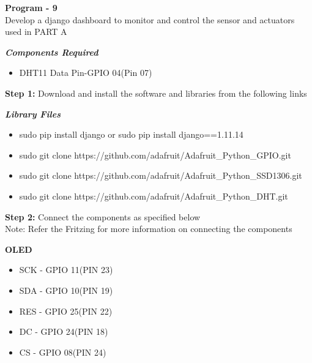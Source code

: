 \documentclass[12pt,a4paper]{article}
\begin{document}
\clearpage
\begin{center}
{\large{\textbf{Program - 9}}\\
Develop a django dashboard to monitor and control the sensor and actuators used in PART A}
\end{center}
\begin{flushleft}
\textbf{\textit{Components Required}}
\begin{itemize}[noitemsep,nolistsep]
\item DHT11 Data Pin-GPIO 04(Pin 07)
\end{itemize}
\vspace{5mm}

\textbf{Step 1:} Download and install the software and libraries from the following links \\
\vspace{5mm}

\textbf{\textit{Library Files}}\\ \begin{itemize}[noitemsep,nolistsep]
\item sudo pip install django or sudo pip install django==1.11.14
\item sudo git clone https://github.com/adafruit/Adafruit\_Python\_GPIO.git
\item sudo git clone https://github.com/adafruit/Adafruit\_Python\_SSD1306.git
\item sudo git clone https://github.com/adafruit/Adafruit\_Python\_DHT.git
\end{itemize}
\vspace{5mm}

\textbf{Step 2:} Connect the components as specified below\\
Note: Refer the Fritzing for more information on connecting the components
\vspace{5mm}

\textbf{OLED}
\begin{itemize}[noitemsep,nolistsep]
\item SCK - GPIO 11(PIN 23)
\item SDA - GPIO 10(PIN 19)
\item RES - GPIO 25(PIN 22)
\item DC - GPIO 24(PIN 18)
\item CS - GPIO 08(PIN 24)
\end{itemize}


\end{flushleft}
\end{document}
